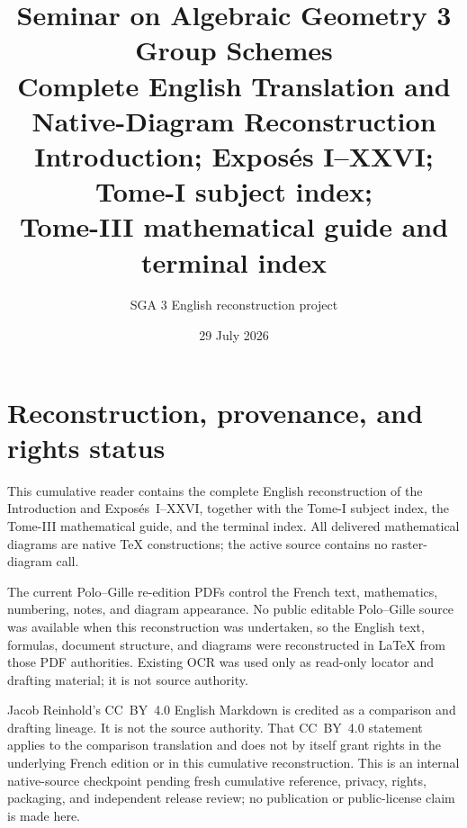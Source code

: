\documentclass[11pt,a4paper,oneside]{book}
\title{Seminar on Algebraic Geometry 3\\
  \large Group Schemes\\[0.75em]
  \normalsize Complete English Translation and Native-Diagram
  Reconstruction\\
  \small Introduction; Expos\'es I--XXVI; Tome-I subject index;\\
  Tome-III mathematical guide and terminal index}
\author{SGA 3 English reconstruction project}
\date{29 July 2026}
\makeatletter
\theoremstyle{plain}
\theoremstyle{definition}
\theoremstyle{remark}
\newcommand{\SGAInputRoot}[1]{%
  \def@path{{inputs/#1/}}%
}
\newcommand{\SGAStartExpose}[1]{%
  \clearpage
  \setcounter{section}{0}%
  \setcounter{subsection}{0}%
  \setcounter{theorem}{0}%
  \setcounter{footnote}{0}%
  \setcounter{figure}{0}%
  \SGAInputRoot{#1}%
}
\makeatother
\begin{document}
\frontmatter
\maketitle

\chapter*{Reconstruction, provenance, and rights status}
This cumulative reader contains the complete English reconstruction of
the Introduction and Expos\'es~I--XXVI, together with the Tome-I subject
index, the Tome-III mathematical guide, and the terminal index.  All
delivered mathematical diagrams are native \TeX{} constructions; the
active source contains no raster-diagram call.

The current Polo--Gille re-edition PDFs control the French text,
mathematics, numbering, notes, and diagram appearance.  No public
editable Polo--Gille source was available when this reconstruction was
undertaken, so the English text, formulas, document structure, and
diagrams were reconstructed in \LaTeX{} from those PDF authorities.
Existing OCR was used only as read-only locator and drafting material;
it is not source authority.

Jacob Reinhold's CC~BY~4.0 English Markdown is credited as a comparison
and drafting lineage.  It is not the source authority.  That CC~BY~4.0
statement applies to the comparison translation and does not by itself
grant rights in the underlying French edition or in this cumulative
reconstruction.  This is an internal native-source checkpoint pending
fresh cumulative reference, privacy, rights, packaging, and independent
release review; no publication or public-license claim is made here.

\tableofcontents

\mainmatter

\SGAInputRoot{INTRO}


\SGAStartExpose{I}


\makeatletter
\providecommand{\SGAThreeNativeInput}[2][0.92\textwidth]{%
  \begin{adjustbox}{max width=#1,center,varwidth=\maxdimen}%
  \end{adjustbox}%
}
\providecommand{\SGAThreeNativeDiagram}[5][0.92\textwidth]{%
  \begin{figure}[H]
    \centering
    \SGAThreeNativeInput[#1]{#2}%
    \caption{#3}
    \label{#4}
    \par\smallskip
    {\footnotesize\itshape Native \TeX{} reconstruction; source locator: #5.}
  \end{figure}%
}
\makeatother
\end{document}
